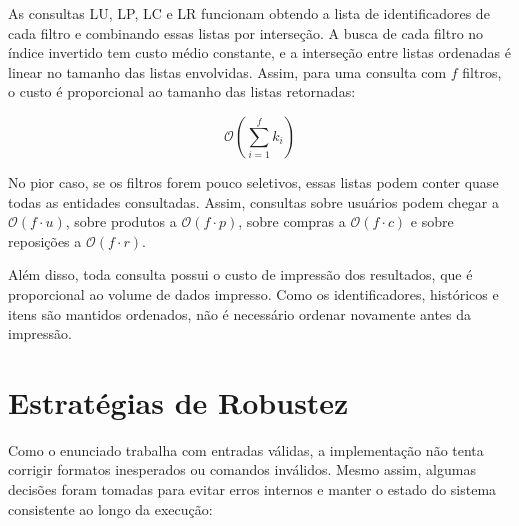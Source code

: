 \documentclass[11pt,a4paper]{article}
\begin{document}
As consultas LU, LP, LC e LR funcionam obtendo a lista de identificadores de cada filtro e combinando essas listas por interseção. A busca de cada filtro no índice invertido tem custo médio constante, e a interseção entre listas ordenadas é linear no tamanho das listas envolvidas. Assim, para uma consulta com \(f\) filtros, o custo é proporcional ao tamanho das listas retornadas:

\[
\mathcal{O}\left(\sum_{i=1}^{f} k_i\right)
\]

No pior caso, se os filtros forem pouco seletivos, essas listas podem conter quase todas as entidades consultadas. Assim, consultas sobre usuários podem chegar a \(\mathcal{O}(f \cdot u)\), sobre produtos a \(\mathcal{O}(f \cdot p)\), sobre compras a \(\mathcal{O}(f \cdot c)\) e sobre reposições a \(\mathcal{O}(f \cdot r)\).

Além disso, toda consulta possui o custo de impressão dos resultados, que é proporcional ao volume de dados impresso. Como os identificadores, históricos e itens são mantidos ordenados, não é necessário ordenar novamente antes da impressão.

\section{Estratégias de Robustez}

Como o enunciado trabalha com entradas válidas, a implementação não tenta corrigir formatos inesperados ou comandos inválidos. Mesmo assim, algumas decisões foram tomadas para evitar erros internos e manter o estado do sistema consistente ao longo da execução:
\end{document}
